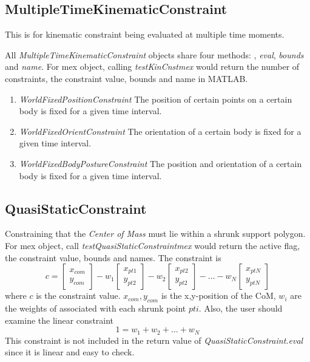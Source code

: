\documentclass{article}
\begin{document}
\subsection{MultipleTimeKinematicConstraint}
This is for kinematic constraint being evaluated at multiple time moments.

All \textsl{MultipleTimeKinematicConstraint} objects share four methods: , \textsl{eval}, \textsl{bounds} and \textsl{name}. For mex object, calling \textsl{testKinCnstmex} would return the number of constraints, the constraint value, bounds and name in MATLAB.
\begin{enumerate}
\item \textsl{WorldFixedPositionConstraint} The position of certain points on a certain body is fixed for a given time interval.
\item \textsl{WorldFixedOrientConstraint} The orientation of a certain body is fixed for a given time interval.
\item \textsl{WorldFixedBodyPostureConstraint} The position and orientation of a certain body is fixed for a given time interval.
\end{enumerate}

\subsection{QuasiStaticConstraint}
Constraining that the \textit{Center of Mass} must lie within a shrunk support polygon. For mex object, call \textsl{testQuasiStaticConstraintmex} would return the active flag, the constraint value, bounds and names. The constraint is
\begin{equation}
c = \begin{bmatrix}x_{com}\\y_{com}\end{bmatrix}-w_1\begin{bmatrix}x_{pt1}\\y_{pt2}\end{bmatrix}-w_2\begin{bmatrix}x_{pt2}\\y_{pt2}\end{bmatrix}-\hdots-w_N\begin{bmatrix}x_{ptN}\\y_{ptN}\end{bmatrix}
\end{equation}
where $c$ is the constraint value. $x_{com},y_{com}$ is the x,y-position of the CoM, $w_i$ are the weights of associated with each shrunk point $pti$. Also, the user should examine the linear constraint
\begin{equation}
1 = w_1+w_2+\hdots+w_N
\end{equation}
This constraint is not included in the return value of \textsl{QuasiStaticConstraint.eval} since it is linear and easy to check.
\end{document}
